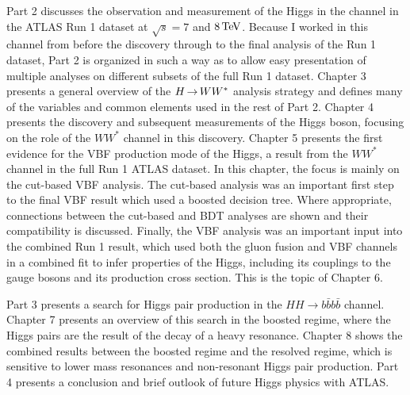 Part 2 discusses the observation and measurement of the Higgs in the \HWWfull channel in the ATLAS Run 1 dataset at $\sqrt{s} = 7$ and $8 \TeV$. Because I worked in this channel from before the discovery through to the final analysis of the Run 1 dataset, Part 2 is organized in such a way as to allow easy presentation of multiple analyses on different subsets of the full Run 1 dataset. Chapter 3 presents a general overview of the $H{\,{\rightarrow}\,}WW^\ast$ analysis strategy and defines many of the variables and common elements used in the rest of Part 2. Chapter 4 presents the discovery and subsequent measurements of the Higgs boson, focusing on the role of the $WW^*$ channel in this discovery. Chapter 5 presents the first evidence for the VBF production mode of the Higgs, a result from the $WW^*$ channel in the full Run 1 ATLAS dataset. In this chapter, the focus is mainly on the cut-based VBF analysis. The cut-based analysis was an important first step to the final VBF result which used a boosted decision tree. Where appropriate, connections between the cut-based and BDT analyses are shown and their compatibility is discussed. Finally, the VBF analysis was an important input into the combined Run 1 \HWWfull result, which used both the gluon fusion and VBF channels in a combined fit to infer properties of the Higgs, including its couplings to the gauge bosons and its production cross section. This is the topic of Chapter 6. 

Part 3 presents a search for Higgs pair production in the $HH \to b\bar{b} b\bar{b}$ channel. Chapter 7 presents an overview of this search in the boosted regime, where the Higgs pairs are the result of the decay of a heavy resonance. Chapter 8 shows the combined results between the boosted regime and the resolved regime, which is sensitive to lower mass resonances and non-resonant Higgs pair production. Part 4 presents a conclusion and brief outlook of future Higgs physics with ATLAS.